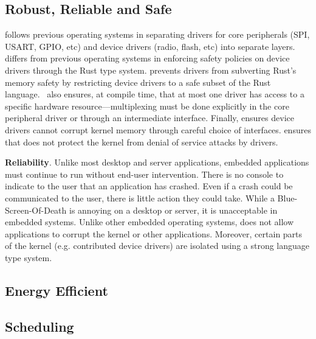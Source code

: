 \subsection{Robust, Reliable and Safe}
 \name follows previous operating systems in separating
drivers for core peripherals (SPI, USART, GPIO, etc) and device drivers (radio,
flash, etc) into separate layers. \name differs from previous operating systems
in enforcing safety policies on device drivers through the Rust type system.
\name prevents drivers from subverting Rust's memory safety by restricting
device drivers to a safe subset of the Rust language.~ \name
also ensures, at compile time, that at most one driver has access to a specific
hardware resource---multiplexing must be done explicitly in the core peripheral
driver or through an intermediate interface. Finally, \name ensures device
drivers cannot corrupt kernel memory through careful choice of interfaces. \name
ensures that \name does not protect the kernel from denial of service attacks by
drivers. %

{\bf Reliability}. Unlike most desktop and server applications, embedded
applications must continue to run without end-user intervention. There is no
console to indicate to the user that an application has crashed. Even if a crash
could be communicated to the user, there is little action they could take. While
a Blue-Screen-Of-Death is annoying on a desktop or server, it is unacceptable in
embedded systems. Unlike other embedded operating systems, \name does not allow
applications to corrupt the kernel or other applications. Moreover, certain
parts of the kernel (e.g. contributed device drivers) are isolated using
a strong language type system.

\subsection{Energy Efficient}


\subsection{Scheduling}


